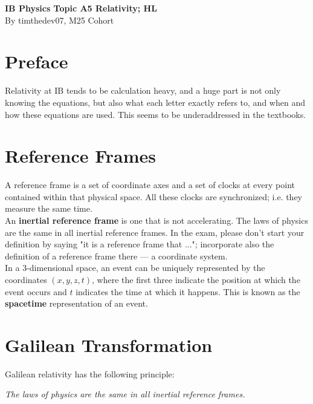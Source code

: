 \documentclass[a4paper,12pt]{article}
\let\oldsection\section
\renewcommand\section{\clearpage\oldsection}
\newcommand{\lb}{\\[8pt]}
\begin{document}
\pagestyle{fancy}


\begin{titlepage}
  \begin{center}

    \vspace*{8cm}
    \textbf{\Large {IB Physics Topic A5 Relativity; HL}} \\
    \vspace*{1cm}
    \large{By timthedev07, M25 Cohort}

  \end{center}
\end{titlepage}


\pagebreak
\section*{Preface}
Relativity at IB tends to be calculation heavy, and a huge part is not only knowing the equations, but also what each letter exactly refers to, and when and how these equations are used. This seems to be underaddressed in the textbooks.
\pagebreak
\tableofcontents
\pagebreak

\clearpage
\setcounter{page}{1}

\section{Reference Frames}

A reference frame is a set of coordinate axes and a set of clocks at every point contained within that physical space. All these clocks are synchronized; i.e. they measure the same time.\lb
An \textbf{inertial reference frame} is one that is not accelerating. The laws of physics are the same in all inertial reference frames. In the exam, please don't start your definition by saying "it is a reference frame that ..."; incorporate also the definition of a reference frame there --- a coordinate system. \lb
In a 3-dimensional space, an event can be uniquely represented by the coordinates $(x, y, z, t)$, where the first three indicate the position at which the event occurs and $t$ indicates the time at which it happens. This is known as the \textbf{spacetime} representation of an event.

\section{Galilean Transformation}
Galilean relativity has the following principle:
\begin{center}
  \textit{The laws of physics are the same in all inertial reference frames.}
\end{center}
\end{document}
